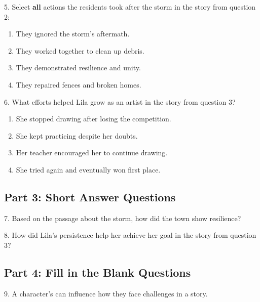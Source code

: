 \documentclass[12pt]{article}
\begin{document}
\vspace{1cm}

5. Select \textbf{all} actions the residents took after the storm in the story from question 2:\\
\begin{enumerate}[label=\Alph*.]
    \item They ignored the storm’s aftermath.  
    \item They worked together to clean up debris.  
    \item They demonstrated resilience and unity.  
    \item They repaired fences and broken homes.  
\end{enumerate}

\vspace{1cm}

6. What efforts helped Lila grow as an artist in the story from question 3?\\
\begin{enumerate}[label=\Alph*.]
    \item She stopped drawing after losing the competition.  
    \item She kept practicing despite her doubts.  
    \item Her teacher encouraged her to continue drawing.  
    \item She tried again and eventually won first place.  
\end{enumerate}

\vspace{1cm}
\newpage
\subsection*{Part 3: Short Answer Questions}

7. Based on the passage about the storm, how did the town show resilience?\\
\vspace{4cm}

8. How did Lila’s persistence help her achieve her goal in the story from question 3?\\
\vspace{4cm}

\subsection*{Part 4: Fill in the Blank Questions}
\vspace{1em}
9. A character’s \underline{\hspace{4cm}} can influence how they face challenges in a story.
\end{document}
